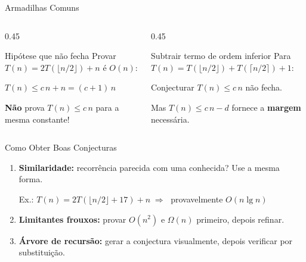 \documentclass[aspectratio=169]{beamer}
\newcommand{\impt}[1]{\textcolor{maccent}{\textbf{#1}}}
\newcommand{\ntc}[1]{\textcolor{mprimary}{#1}}
\begin{document}
\begin{frame}{Armadilhas Comuns}
\begin{columns}[T]
\begin{column}{0.45\textwidth}
\begin{alertblock}{Hipótese que não fecha}
Provar $T(n) = 2T(\lfloor n/2\rfloor) + n$ é $O(n)$:

$T(n) \leq c\,n + n = (c+1)\,n$

\impt{Não} prova $T(n) \leq c\,n$ para a mesma constante!
\end{alertblock}
\end{column}

\pause

\begin{column}{0.45\textwidth}
\begin{block}{Subtrair termo de ordem inferior}
Para $T(n) = T(\lfloor n/2\rfloor) + T(\lceil n/2\rceil) + 1$:

Conjecturar $T(n) \leq c\,n$ não fecha.

Mas $T(n) \leq c\,n - d$ fornece a \impt{margem} necessária.
\end{block}
\end{column}
\end{columns}
\end{frame}


\begin{frame}{Como Obter Boas Conjecturas}
\begin{enumerate}
    \item \textbf{Similaridade:} recorrência parecida com uma conhecida? Use a mesma forma.
    
    \ntc{Ex.:} $T(n) = 2T(\lfloor n/2\rfloor + 17) + n \;\Rightarrow\;$ provavelmente $O(n\lg n)$
    
    \pause
    \vspace{0.2cm}
    
    \item \textbf{Limitantes frouxos:} provar $O(n^2)$ e $\Omega(n)$ primeiro, depois refinar.
    
    \pause
    \vspace{0.2cm}
    
    \item \textbf{Árvore de recursão:} gerar a conjectura visualmente, depois verificar por substituição.
\end{enumerate}
\end{frame}
\end{document}
